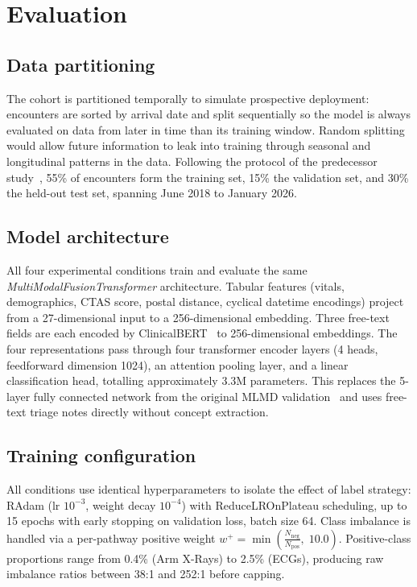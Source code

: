 \section[Evaluation]{Evaluation\footnotemark[\value{footnote}]}

\subsection{Data partitioning}

The cohort is partitioned temporally to simulate prospective deployment: encounters are sorted by arrival date and split sequentially so the model is always evaluated on data from later in time than its training window. Random splitting would allow future information to leak into training through seasonal and longitudinal patterns in the data. Following the protocol of the predecessor study~\cite{singh_assessment_2022}, 55\% of encounters form the training set, 15\% the validation set, and 30\% the held-out test set, spanning June 2018 to January 2026.

\subsection{Model architecture}

All four experimental conditions train and evaluate the same \textit{MultiModalFusionTransformer} architecture. Tabular features (vitals, demographics, CTAS score, postal distance, cyclical datetime encodings) project from a 27-dimensional input to a 256-dimensional embedding. Three free-text fields are each encoded by ClinicalBERT~\cite{alsentzer_publicly_2019} to 256-dimensional embeddings. The four representations pass through four transformer encoder layers (4 heads, feedforward dimension 1024), an attention pooling layer, and a linear classification head, totalling approximately 3.3M parameters. This replaces the 5-layer fully connected network from the original MLMD validation~\cite{singh_assessment_2022} and uses free-text triage notes directly without concept extraction.

\subsection{Training configuration}

All conditions use identical hyperparameters to isolate the effect of label strategy: RAdam (lr $10^{-3}$, weight decay $10^{-4}$) with ReduceLROnPlateau scheduling, up to 15 epochs with early stopping on validation loss, batch size 64. Class imbalance is handled via a per-pathway positive weight $w^{+} = \min\!\left(\frac{N_{\text{neg}}}{N_{\text{pos}}},\; 10.0\right)$. Positive-class proportions range from 0.4\% (Arm X-Rays) to 2.5\% (ECGs), producing raw imbalance ratios between 38:1 and 252:1 before capping.

